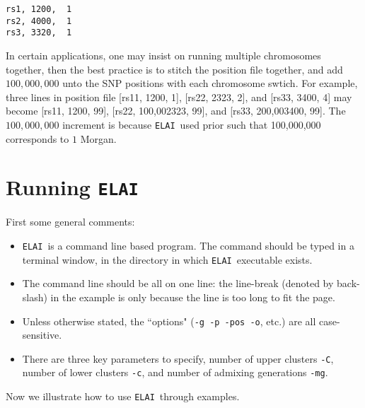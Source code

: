 \documentclass[11pt,Palatino]{article}
\def\elai{{\tt{ELAI}}~}
\begin{document}
\begin{verbatim}
rs1, 1200,  1
rs2, 4000,  1
rs3, 3320,  1
\end{verbatim}

In certain applications, one may insist on running multiple chromosomes together, then the best practice is to stitch the position file together,  and add $100,000,000$ unto the SNP positions with each chromosome swtich.  For example,  three lines in position file [rs11, 1200, 1],  [rs22, 2323, 2], and [rs33, 3400, 4] may become  [rs11, 1200, 99], [rs22, 100,002323, 99], and [rs33, 200,003400, 99]. The $100,000,000$ increment is because \elai used prior such that 100,000,000 corresponds to $1$ Morgan.  

\section {Running \elai}

First some general comments:  
\begin{itemize}
\itemsep-0.02in 
\item \elai is a command line based program. The command should be typed in a terminal window, in the directory in which \elai executable exists.
\item The command line should be all on one line: the line-break (denoted by back-slash) in the example is only because the line is too long to fit the page.
\item Unless otherwise stated, the ``options" ({\tt -g -p -pos -o}, etc.) are all case-sensitive.
\item There are three key parameters to specify, number of upper clusters {\tt -C}, number of lower clusters {\tt -c}, and number of admixing generations {\tt -mg}. 
\end{itemize}
Now we illustrate how to use \elai through examples.
\end{document}
